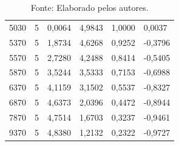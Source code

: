 \begin{table}[H]
\begin{center}
{\begin{tabular}{llllll}
				5030                       & 5                            & 0,0064                       & 4,9843                       & 1,0000                                      & 0,0037                                        \\
				5370                       & 5                            & 1,8734                       & 4,6268                       & 0,9252                                      & -0,3796                                       \\
				5570                       & 5                            & 2,7280                       & 4,2488                       & 0,8414                                      & -0,5405                                       \\
				5870                       & 5                            & 3,5244                       & 3,5333                       & 0,7153                                      & -0,6988                                       \\
				6370                       & 5                            & 4,1159                       & 3,1502                       & 0,5537                                      & -0,8327                                       \\
				6870                       & 5                            & 4,6373                       & 2,0396                       & 0,4472                                      & -0,8944                                       \\
				7870                       & 5                            & 4,7514                       & 1,6703                       & 0,3237                                      & -0,9461                                       \\
				9370                       & 5                            & 4,8380                       & 1,2132                       & 0,2322                                      & -0,9727                                       \\
				\hline
			\end{tabular}}

	\end{center}
	\caption*{Fonte: Elaborado pelos autores.}
	\label{tabela}
\end{table}

